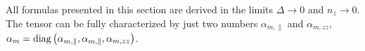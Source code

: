 All formulas presented in this section are derived in the limits $\Delta\rightarrow0$ and $n_z\rightarrow 0$. The tensor can be fully characterized by just two numbers $\alpha_{m,\parallel}$ and $\alpha_{m,zz}$,  $\alpha_m=\operatorname{diag}\left(\alpha_{m,\parallel}, \alpha_{m,\parallel}, \alpha_{m,zz}\right)$.

